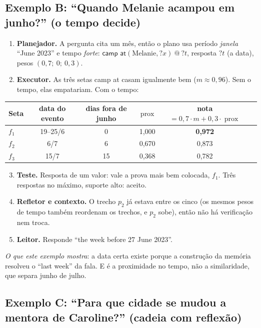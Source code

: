 \documentclass[11pt]{article}
\newcommand{\rel}[1]{\textsf{#1}}
\newcommand{\V}[1]{\mathord{?}\mathit{#1}}
\newcommand{\prox}{\operatorname{prox}}
\begin{document}
\subsection*{Exemplo B: ``Quando Melanie acampou em junho?'' (o tempo decide)}

\begin{enumerate}
\item \textbf{Planejador.} A pergunta cita um mês, então o plano usa
  período \emph{janela} ``June 2023'' e tempo \emph{forte}:
  $\rel{camp at}(\text{Melanie},\V x)\ @\ \V t$, resposta $\V t$ (a data),
  pesos $(0{,}7;\ 0;\ 0{,}3)$.
\item \textbf{Executor.} As três setas \rel{camp at} casam igualmente bem
  ($m\approx0{,}96$). Sem o tempo, elas empatariam. Com o tempo:
\end{enumerate}
\begin{center}\small
\begin{tabular}{@{}lccccc@{}}
\toprule
Seta & data do evento & dias fora de junho & $\prox$ & nota $=0{,}7\cdot m+0{,}3\cdot\prox$ \\
\midrule
$f_1$ & 19--25/6 & 0 & 1,000 & \textbf{0,972} \\
$f_2$ & 6/7 & 6 & 0,670 & 0,873 \\
$f_3$ & 15/7 & 15 & 0,368 & 0,782 \\
\bottomrule
\end{tabular}
\end{center}
\begin{enumerate}\setcounter{enumi}{2}
\item \textbf{Teste.} Resposta de um valor: vale a prova mais bem colocada,
  $f_1$. Três respostas no máximo, suporte alto: aceito.
\item \textbf{Refletor e contexto.} O trecho $p_2$ já estava entre os cinco
  (os mesmos pesos de tempo também reordenam os trechos, e $p_2$ sobe), então
  não há verificação nem troca.
\item \textbf{Leitor.} Responde ``the week before 27 June 2023''.
\end{enumerate}
\emph{O que este exemplo mostra}: a data certa existe porque a construção da
memória resolveu o ``last week'' da fala. E é a proximidade no tempo, não a
similaridade, que separa junho de julho.

\subsection*{Exemplo C: ``Para que cidade se mudou a mentora de Caroline?'' (cadeia com reflexão)}
\end{document}
